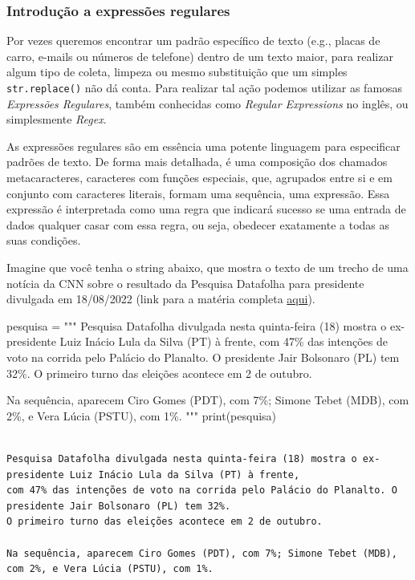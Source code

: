 \documentclass[
  brazilian,
  letterpaper,
  DIV=11,
  numbers=noendperiod]{scrreprt}
\newenvironment{Shaded}{\begin{snugshade}}{\end{snugshade}}
\newcommand{\BuiltInTok}[1]{\textcolor[rgb]{0.00,0.23,0.31}{#1}}
\newcommand{\NormalTok}[1]{\textcolor[rgb]{0.00,0.23,0.31}{#1}}
\newcommand{\OperatorTok}[1]{\textcolor[rgb]{0.37,0.37,0.37}{#1}}
\newcommand{\SpecialCharTok}[1]{\textcolor[rgb]{0.37,0.37,0.37}{#1}}
\newcommand{\StringTok}[1]{\textcolor[rgb]{0.13,0.47,0.30}{#1}}
\begin{document}
\subsubsection{Introdução a expressões
regulares}\label{introduuxe7uxe3o-a-expressuxf5es-regulares}

Por vezes queremos encontrar um padrão específico de texto (e.g., placas
de carro, e-mails ou números de telefone) dentro de um texto maior, para
realizar algum tipo de coleta, limpeza ou mesmo substituição que um
simples \texttt{str.replace()} não dá conta. Para realizar tal ação
podemos utilizar as famosas \emph{Expressões Regulares}, também
conhecidas como \emph{Regular Expressions} no inglês, ou simplesmente
\emph{Regex}.

As expressões regulares são em essência uma potente linguagem para
especificar padrões de texto. De forma mais detalhada, é uma composição
dos chamados metacaracteres, caracteres com funções especiais, que,
agrupados entre si e em conjunto com caracteres literais, formam uma
sequência, uma expressão. Essa expressão é interpretada como uma regra
que indicará sucesso se uma entrada de dados qualquer casar com essa
regra, ou seja, obedecer exatamente a todas as suas condições.

Imagine que você tenha o string abaixo, que mostra o texto de um trecho
de uma notícia da CNN sobre o resultado da Pesquisa Datafolha para
presidente divulgada em 18/08/2022 (link para a matéria completa
\href{https://www.cnnbrasil.com.br/politica/pesquisa-datafolha-para-presidente-lula-tem-47-bolsonaro-32/}{aqui}).

\begin{Shaded}
\begin{Highlighting}[]
\NormalTok{pesquisa }\OperatorTok{=} \StringTok{"""}
\StringTok{Pesquisa Datafolha divulgada nesta quinta{-}feira (18) mostra o ex{-}presidente Luiz Inácio Lula da Silva (PT) à frente, }
\StringTok{com 47}\SpecialCharTok{\% d}\StringTok{as intenções de voto na corrida pelo Palácio do Planalto. O presidente Jair Bolsonaro (PL) tem 32\%. }
\StringTok{O primeiro turno das eleições acontece em 2 de outubro.}

\StringTok{Na sequência, aparecem Ciro Gomes (PDT), com 7\%; Simone Tebet (MDB), com 2\%, e Vera Lúcia (PSTU), com 1\%.}
\StringTok{"""}
\BuiltInTok{print}\NormalTok{(pesquisa)}
\end{Highlighting}
\end{Shaded}

\begin{verbatim}

Pesquisa Datafolha divulgada nesta quinta-feira (18) mostra o ex-presidente Luiz Inácio Lula da Silva (PT) à frente, 
com 47% das intenções de voto na corrida pelo Palácio do Planalto. O presidente Jair Bolsonaro (PL) tem 32%. 
O primeiro turno das eleições acontece em 2 de outubro.

Na sequência, aparecem Ciro Gomes (PDT), com 7%; Simone Tebet (MDB), com 2%, e Vera Lúcia (PSTU), com 1%.
\end{verbatim}
\end{document}

